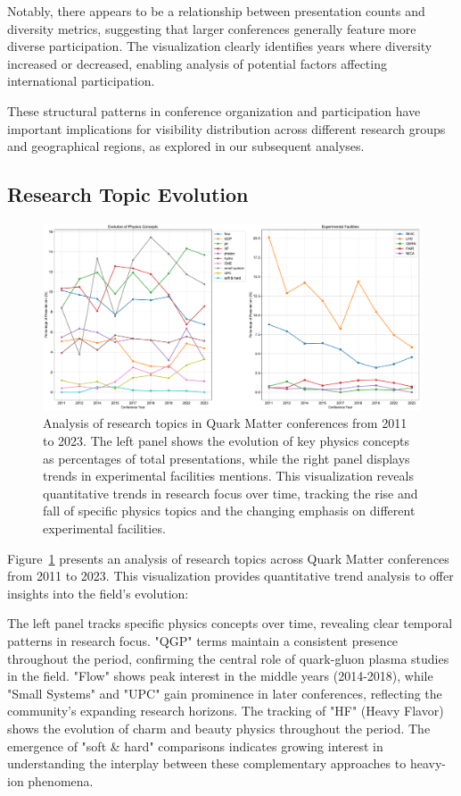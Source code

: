 \documentclass[a4paper,11pt]{article}
\begin{document}
Notably, there appears to be a relationship between presentation counts and diversity metrics, suggesting that larger conferences generally feature more diverse participation. The visualization clearly identifies years where diversity increased or decreased, enabling analysis of potential factors affecting international participation.

These structural patterns in conference organization and participation have important implications for visibility distribution across different research groups and geographical regions, as explored in our subsequent analyses.

\subsection{Research Topic Evolution}

\begin{figure}[H]
\centering
\includegraphics[width=\textwidth]{figures/QM_keyword_analysis.pdf}
\caption{Analysis of research topics in Quark Matter conferences from 2011 to 2023. The left panel shows the evolution of key physics concepts as percentages of total presentations, while the right panel displays trends in experimental facilities mentions. This visualization reveals quantitative trends in research focus over time, tracking the rise and fall of specific physics topics and the changing emphasis on different experimental facilities.}
\label{fig:keywords}
\end{figure}

Figure~\ref{fig:keywords} presents an analysis of research topics across Quark Matter conferences from 2011 to 2023. This visualization provides quantitative trend analysis to offer insights into the field's evolution:

The left panel tracks specific physics concepts over time, revealing clear temporal patterns in research focus. "QGP" terms maintain a consistent presence throughout the period, confirming the central role of quark-gluon plasma studies in the field. "Flow" shows peak interest in the middle years (2014-2018), while "Small Systems" and "UPC" gain prominence in later conferences, reflecting the community's expanding research horizons. The tracking of "HF" (Heavy Flavor) shows the evolution of charm and beauty physics throughout the period. The emergence of "soft \& hard" comparisons indicates growing interest in understanding the interplay between these complementary approaches to heavy-ion phenomena.
\end{document}
